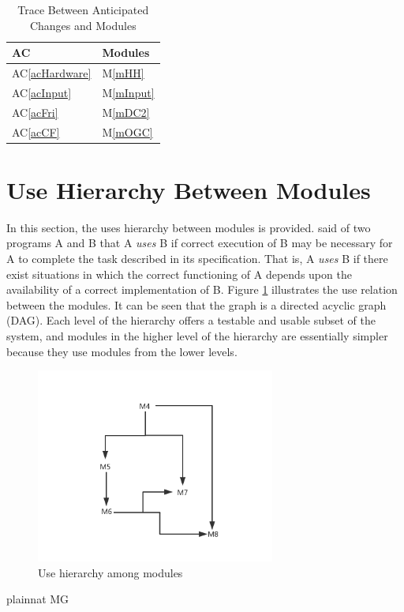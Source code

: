 \documentclass[12pt, titlepage]{article}
\newcommand{\acref}[1]{AC\ref{#1}}
\newcommand{\mref}[1]{M\ref{#1}}
\begin{document}
	\begin{table}[H]
		\centering
		\begin{tabular}{p{} p{}}
			\toprule
			\textbf{AC} & \textbf{Modules}\\
			\midrule
			\acref{acHardware} & \mref{mHH}\\
			\acref{acInput} & \mref{mInput}\\
			\acref{acFri} & \mref{mDC2}\\
			\acref{acCF} & \mref{mOGC}\\
			\bottomrule
		\end{tabular}
		\caption{Trace Between Anticipated Changes and Modules}
		\label{TblACT}
	\end{table}
	
	\section{Use Hierarchy Between Modules} \label{SecUse}
	
	In this section, the uses hierarchy between modules is
	provided. \citet{Parnas1978} said of two programs A and B that A {\em uses} B if
	correct execution of B may be necessary for A to complete the task described in
	its specification. That is, A {\em uses} B if there exist situations in which
	the correct functioning of A depends upon the availability of a correct
	implementation of B.  Figure \ref{FigUH} illustrates the use relation between
	the modules. It can be seen that the graph is a directed acyclic graph
	(DAG). Each level of the hierarchy offers a testable and usable subset of the
	system, and modules in the higher level of the hierarchy are essentially simpler
	because they use modules from the lower levels.
	
	\begin{figure}[H]
		\centering
		\includegraphics[width=0.7\textwidth]{./Figure1.png}
		\caption{Use hierarchy among modules}
		\label{FigUH}
	\end{figure}
	
	
	 {plainnat}
	 {MG}
	
\end{document}
